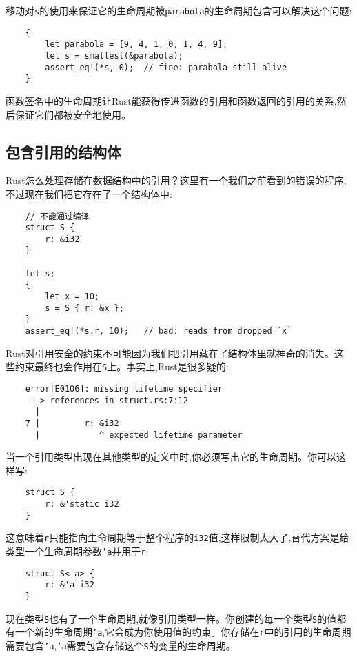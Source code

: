 移动对\texttt{s}的使用来保证它的生命周期被\texttt{parabola}的生命周期包含可以解决这个问题:
\begin{verbatim}
    {
        let parabola = [9, 4, 1, 0, 1, 4, 9];
        let s = smallest(&parabola);
        assert_eq!(*s, 0);  // fine: parabola still alive
    }
\end{verbatim}

函数签名中的生命周期让Rust能获得传进函数的引用和函数返回的引用的关系,然后保证它们都被安全地使用。

\subsection{包含引用的结构体}\label{refstruct}

Rust怎么处理存储在数据结构中的引用？这里有一个我们之前看到的错误的程序,不过现在我们把它存在了一个结构体中:
\begin{verbatim}
    // 不能通过编译
    struct S {
        r: &i32
    }
    
    let s;
    {
        let x = 10;
        s = S { r: &x };
    }
    assert_eq!(*s.r, 10);   // bad: reads from dropped `x`
\end{verbatim}

Rust对引用安全的约束不可能因为我们把引用藏在了结构体里就神奇的消失。这些约束最终也会作用在\texttt{S}上。事实上,Rust是很多疑的:
\begin{verbatim}
    error[E0106]: missing lifetime specifier
     --> references_in_struct.rs:7:12
      |
    7 |         r: &i32
      |            ^ expected lifetime parameter
\end{verbatim}

当一个引用类型出现在其他类型的定义中时,你必须写出它的生命周期。你可以这样写:
\begin{verbatim}
    struct S {
        r: &'static i32
    }
\end{verbatim}

这意味着\texttt{r}只能指向生命周期等于整个程序的\texttt{i32}值,这样限制太大了,替代方案是给类型一个生命周期参数\texttt{'a}并用于\texttt{r}:
\begin{verbatim}
    struct S<'a> {
        r: &'a i32
    }
\end{verbatim}

现在类型\texttt{S}也有了一个生命周期,就像引用类型一样。你创建的每一个类型\texttt{S}的值都有一个新的生命周期\texttt{'a},它会成为你使用值的约束。你存储在\texttt{r}中的引用的生命周期需要包含\texttt{'a},\texttt{'a}需要包含存储这个\texttt{S}的变量的生命周期。

